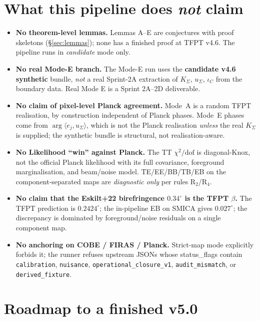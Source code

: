 \section{What this pipeline does \emph{not} claim}
\label{sec:nonclaims}

\begin{itemize}[leftmargin=1.4em]
\item \textbf{No theorem-level lemmas.}  Lemmas A--E are conjectures
with proof skeletons (\S\ref{sec:lemmas}); none has a finished proof
at TFPT v4.6.  The pipeline runs in \emph{candidate} mode only.
\item \textbf{No real Mode-E branch.}  The Mode-E run uses the
\textbf{candidate v4.6 synthetic} bundle, \emph{not} a real
Sprint-2A extraction of \(K_\Sigma\), \(u_\Sigma\), \(\iota_C\) from
the boundary data.  Real Mode E is a Sprint 2A--2D deliverable.
\item \textbf{No claim of pixel-level Planck agreement.}  Mode~A is a
random TFPT realisation, by construction independent of Planck phases.
Mode~E phases come from \(\arg\langle e_j,u_\Sigma\rangle\), which
is not the Planck realisation \emph{unless} the real
\(K_\Sigma\) is supplied; the synthetic bundle is structural, not
realisation-aware.
\item \textbf{No Likelihood ``win'' against Planck.}  The TT
\(\chi^2/\mathrm{dof}\) is diagonal-Knox, not the official Planck
likelihood with its full covariance, foreground marginalisation, and
beam/noise model.  TE/EE/BB/TB/EB on the component-separated maps are
\emph{diagnostic only} per rules R\(_2\)/R\(_4\).
\item \textbf{No claim that the Eskilt+22 birefringence
\(0.34^\circ\) is the TFPT \(\beta\).}  The TFPT prediction is
\(0.2424^\circ\); the in-pipeline EB on SMICA gives
\(0.027^\circ\); the discrepancy is dominated by foreground/noise
residuals on a single component map.
\item \textbf{No anchoring on COBE / FIRAS / Planck.}  Strict-map mode
explicitly forbids it; the runner refuses upstream JSONs whose
\textsf{status\_flags} contain \texttt{calibration},
\texttt{nuisance}, \texttt{operational\_closure\_v1},
\texttt{audit\_mismatch}, or \texttt{derived\_fixture}.
\end{itemize}

\section{Roadmap to a finished v5.0}
\label{sec:roadmap}

